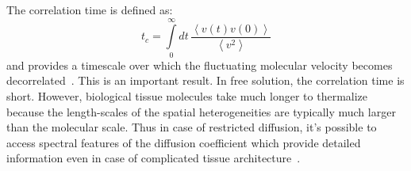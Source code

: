 The correlation time is defined as:
\begin{equation}\label{eq:correlation_time}
t_c=\int\limits_0^\infty dt \, \frac{\left<v(t) v(0)\right> }{\left< v^2\right>} 
\end{equation}
and provides a timescale over which the fluctuating molecular velocity becomes decorrelated~\cite{DerekKJones}. 
This is an important result. 
In free solution, the correlation time is short. 
However, biological tissue molecules take much longer to thermalize because the length-scales of the spatial heterogeneities are typically much larger than the molecular scale. 
Thus in case of restricted diffusion, it's possible to access spectral features of the diffusion coefficient which provide detailed information even in case of complicated tissue architecture~\cite{Tuch:2002ts}.
